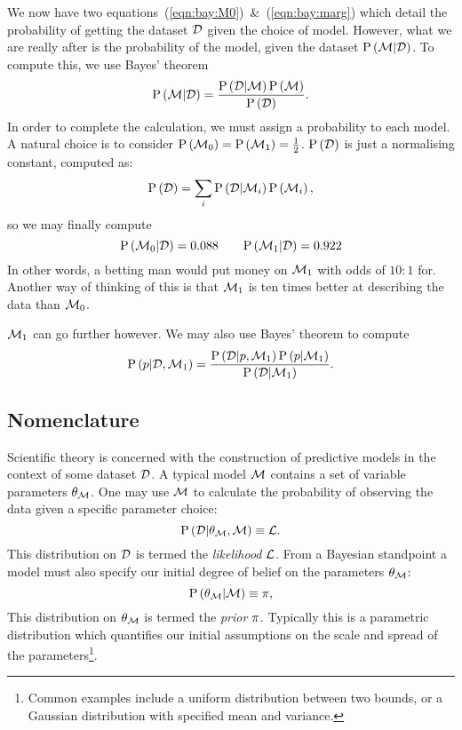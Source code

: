 We now have two equations~(\ref{eqn:bay:M0})~\&~(\ref{eqn:bay:marg}) which detail the probability of getting the dataset $\mathcal{D}$ given the choice of model. However, what we are really after is the probability of the model, given the dataset $\mathrm{P}\left(\mathcal{M}\middle|\mathcal{D}\right)$. To compute this, we use Bayes' theorem
\begin{equation}
  \mathrm{P}\left(\mathcal{M}\middle|\mathcal{D}\right) = \frac{\mathrm{P}\left(\mathcal{D}\middle|\mathcal{M}\right)\mathrm{P}\left(\mathcal{M}\right)}{\mathrm{P}\left(\mathcal{D}\right)}.
  \label{eqn:bay:bay_md}
\end{equation}
In order to complete the calculation, we must assign a probability to each model. A natural choice is to consider $\mathrm{P}\left(\mathcal{M}_0\right)=\mathrm{P}\left(\mathcal{M}_1\right)=\frac{1}{2}$. $\mathrm{P}\left(\mathcal{D}\right)$ is just a normalising constant, computed as:
\begin{equation}
  \mathrm{P}\left(\mathcal{D}\right) = \sum_i \mathrm{P}\left(\mathcal{D}\middle|\mathcal{M}_i\right)\mathrm{P}\left(\mathcal{M}_i\right), 
  \label{eqn:bay:norm}
\end{equation}
so we may finally compute
\begin{equation}
  \mathrm{P}\left(\mathcal{M}_0\middle|\mathcal{D}\right) = 0.088 \qquad
  \mathrm{P}\left(\mathcal{M}_1\middle|\mathcal{D}\right) = 0.922
  \label{eqn:bay:comp}
\end{equation}
In other words, a betting man would put money on $\mathcal{M}_1$ with odds of $10:1$ for. Another way of thinking of this is that $\mathcal{M}_1$ is ten times better at describing the data than $\mathcal{M}_0$.

$\mathcal{M}_1$ can go further however. We may also use Bayes' theorem to compute 
\begin{equation}
  \mathrm{P}\left(p\middle|\mathcal{D},\mathcal{M}_1\right) = \frac{\mathrm{P}\left(\mathcal{D}\middle|p,\mathcal{M}_1\right)\mathrm{P}\left(p\middle|\mathcal{M}_1\right)}{\mathrm{P}\left(\mathcal{D}\middle|\mathcal{M}_1\right)}.
  \label{eqn:bay:bay_p}
\end{equation}





\subsection{Nomenclature}
\label{sec:pc:nomenclature}
Scientific theory is concerned with the construction of predictive models in the context of some dataset $\mathcal{D}$.
A typical model $\mathcal{M}$ contains a set of variable parameters $\theta_{\mathcal{M}}$. One may use $\mathcal{M}$ to calculate the probability of observing the data given a specific parameter choice:
\begin{equation}
  \mathrm{P}\left(\mathcal{D}\middle|\theta_{\mathcal{M}},\mathcal{M}\right)\equiv\mathcal{L}.
  \label{eqn:pc:lik_def}
\end{equation}
This distribution on $\mathcal{D}$ is termed the {\em likelihood\/} $\mathcal{L}$. From a Bayesian standpoint a model must also specify our initial degree of belief on the parameters $\theta_{\mathcal{M}}$:
\begin{equation}
  \mathrm{P}\left(\theta_{\mathcal{M}}\middle|\mathcal{M}\right) \equiv \pi,
  \label{eqn:pc:prior_def}
\end{equation}
This distribution on $\theta_{\mathcal{M}}$ is termed the {\em prior\/} $\pi$. Typically this is a parametric distribution which quantifies our initial assumptions on the scale and spread of the parameters\footnote{Common examples include a uniform distribution between two bounds, or a Gaussian distribution with specified mean and variance.}.

